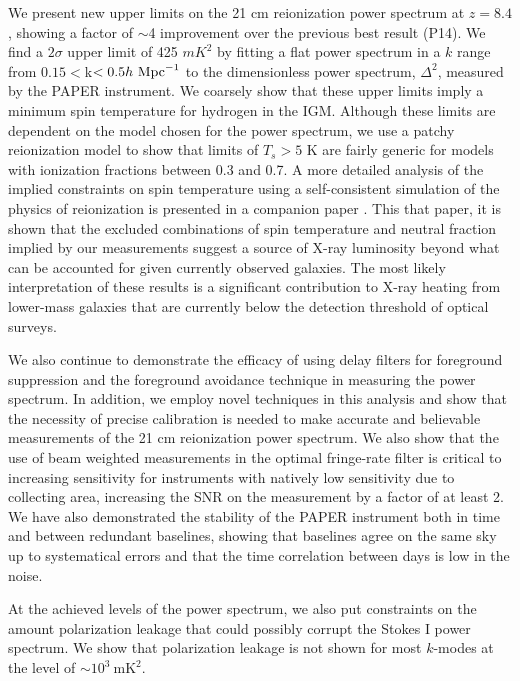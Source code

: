 \documentclass[twocolumn,numberedappendix]{emulateapj} \shorttitle{PSA64}
\newcommand{\hMpci}{h\ {\rm Mpc}^{-1}}
\begin{document}
We present new upper limits on the 21 cm reionization power spectrum at $z=8.4$,
showing a factor of $\sim$4 improvement over the previous best result (P14).
We find a $2\sigma$ upper limit of 425 $mK^{2}$ by fitting a
flat power spectrum in a $k$ range from $0.15<$k$<0.5\hMpci$ to the
dimensionless power spectrum, $\Delta^{2}$, measured by the PAPER instrument. 
We coarsely show that these upper limits imply a minimum spin
temperature for hydrogen in the IGM.  Although these limits are dependent on
the model chosen for the power spectrum, we use a patchy reionization model
to show that limits of $T_s>5$ K are fairly generic for models with
ionization fractions between 0.3 and 0.7.
A more detailed analysis of the implied constraints on spin temperature using
a self-consistent simulation of the physics of reionization is
presented in a companion paper \citep{pober_et_al2015}.  This that paper,
it is shown that the excluded combinations of spin temperature
and neutral fraction implied by our measurements
suggest a source of X-ray luminosity beyond what can be 
accounted for given currently observed galaxies.  The most likely interpretation
of these results is a significant contribution to X-ray heating from lower-mass
galaxies that are currently below the detection threshold of optical surveys.


We also continue to demonstrate the efficacy of using delay filters for
foreground suppression and the foreground avoidance technique in measuring the power
spectrum. In addition, we employ novel techniques in this analysis and show that
the necessity of precise calibration is needed to make accurate and believable
measurements of the 21 cm reionization power spectrum. We also show that the use of beam
weighted measurements in the optimal fringe-rate filter is critical to
increasing sensitivity for instruments with natively low sensitivity due to
collecting area, increasing the SNR on the measurement by a factor of at least 2.
We have also demonstrated the stability of the PAPER instrument both in time and
between redundant baselines, showing that baselines agree on the same sky up to
systematical errors and that the time correlation between days is low in the
noise.

At the achieved levels of the power spectrum, we also put constraints on the
amount polarization leakage that could possibly corrupt the Stokes I power
spectrum. We show that polarization leakage is not shown for most $k$-modes at
the level of $\sim10^{3}\ \text{mK}^{2}$. 
\end{document}
